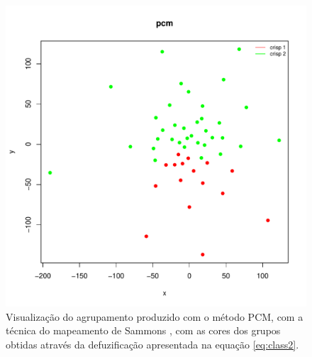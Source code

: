 \begin{figure}[!htp] \centering 
  \centering
  \includegraphics[width=0.8\columnwidth]{assets/future_works/opinosis_sammons.pdf} 
  \caption{Visualização do agrupamento produzido com o método PCM, com a técnica do mapeamento de
Sammons \cite{Sammons2013}, com as cores dos grupos obtidas através da defuzificação apresentada na
equação \ref{eq:class2}.} 
  \label{fig:opinosissammons}
\end{figure}

